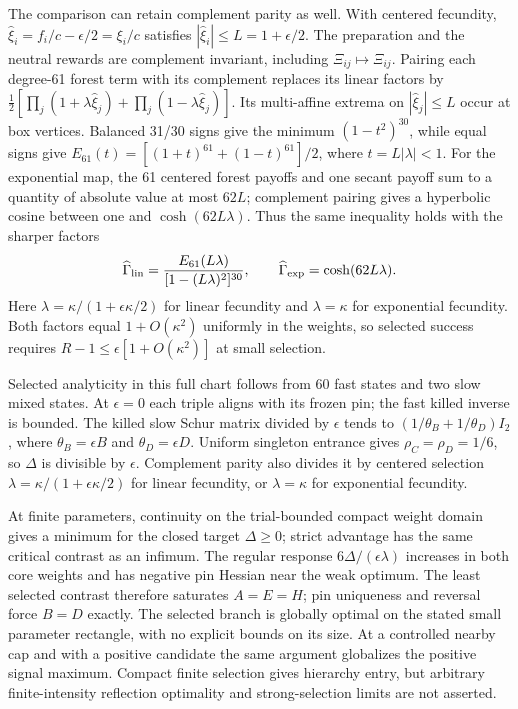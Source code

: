 \documentclass[aps,pre,reprint,amsmath,amssymb,longbibliography]{revtex4-2}
\begin{document}
The comparison can retain complement parity as well. With centered
fecundity, $\widehat\xi_i=f_i/c-\epsilon/2=\xi_i/c$ satisfies
$|\widehat\xi_i|\leq L=1+\epsilon/2$.
The preparation and the neutral rewards are complement invariant, including
$\Xi_{ij}\mapsto\Xi_{ij}$. Pairing each degree-61 forest term with its complement
replaces its linear factors by
$\frac12[\prod_j(1+\lambda\widehat\xi_j)+\prod_j(1-\lambda\widehat\xi_j)]$.
Its multi-affine extrema on $|\widehat\xi_j|\leq L$ occur at box vertices. Balanced
31/30 signs give the minimum $(1-t^2)^{30}$, while equal signs give
$E_{61}(t)=[(1+t)^{61}+(1-t)^{61}]/2$, where $t=L|\lambda|<1$.
For the exponential map, the 61 centered forest payoffs and one secant payoff sum to a
quantity of absolute value at most $62L$; complement pairing gives a
hyperbolic cosine between one and $\cosh(62L\lambda)$. Thus the same inequality
holds with the sharper factors
\begin{equation}
 \widehat\Gamma_{\rm lin}
 =\frac{E_{61}(L\lambda)}{[1-(L\lambda)^2]^{30}},\qquad
 \widehat\Gamma_{\exp}=\cosh(62L\lambda).
 \label{v3-eq-selected-parity-bound}
\end{equation}
Here $\lambda=\kappa/(1+\epsilon\kappa/2)$ for linear fecundity and
$\lambda=\kappa$ for exponential fecundity. Both factors equal
$1+O(\kappa^2)$ uniformly in the weights, so selected success requires
$R-1\leq\epsilon[1+O(\kappa^2)]$ at small selection.

Selected analyticity in this full chart follows from 60
fast states and two slow mixed states. At $\epsilon=0$ each triple aligns
with its frozen pin; the fast killed inverse is bounded. The killed slow Schur
matrix divided by $\epsilon$ tends to $(1/\theta_B+1/\theta_D)I_2$, where
$\theta_B=\epsilon B$ and $\theta_D=\epsilon D$. Uniform singleton
entrance gives $\rho_C=\rho_D=1/6$, so $\Delta$ is divisible by $\epsilon$.
Complement parity also divides it by centered selection
$\lambda=\kappa/(1+\epsilon\kappa/2)$ for linear fecundity, or
$\lambda=\kappa$ for exponential fecundity.

At finite parameters, continuity on the trial-bounded compact weight domain
gives a minimum for the closed target $\Delta\geq0$; strict advantage has
the same critical contrast as an infimum.
The regular response $6\Delta/(\epsilon\lambda)$ increases in both core
weights and has negative pin Hessian near the weak optimum. The least selected
contrast therefore saturates $A=E=H$; pin uniqueness and reversal force
$B=D$ exactly. The selected branch is globally optimal on the stated small
parameter rectangle, with no explicit bounds on its size. At a controlled
nearby cap and with a positive candidate the same argument globalizes the
positive signal maximum. Compact finite selection gives hierarchy entry,
but arbitrary finite-intensity reflection optimality and strong-selection
limits are not asserted.
\end{document}
